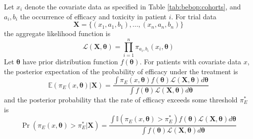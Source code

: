 \documentclass[graybox]{svmult}
\begin{document}
Let $x_i$ denote the covariate data as specified in Table \ref{tab:bebop:cohorts}, and $a_i, b_i$ the occurrence of efficacy and toxicity in patient $i$.
For trial data
\begin{equation}
\boldsymbol{X} = \{(x_1, a_1, b_1), ..., (x_n, a_n, b_n) \}
\end{equation} 
the aggregate likelihood function is
\begin{equation}
\mathcal{L}(\boldsymbol{X}, \boldsymbol{\theta}) = \prod_{i=1}^n \pi_{a_i, b_i} (x_i, \boldsymbol{\theta})
\end{equation}
Let $\boldsymbol{\theta}$ have prior distribution function $f(\boldsymbol{\theta})$.
For patients with covariate data $x$, the posterior expectation of the probability of efficacy under the treatment is 
\begin{equation}
\label{eqn:bebop:post.eff}
\mathbb{E}(\pi_E(x, \boldsymbol{\theta}) | \boldsymbol{X}) = \frac{\int \pi_E(x, \boldsymbol{\theta}) f(\boldsymbol{\theta})  \mathcal{L}(\boldsymbol{X}, \boldsymbol{\theta}) d\boldsymbol{\theta}}{\int f(\boldsymbol{\theta})  \mathcal{L}(\boldsymbol{X}, \boldsymbol{\theta}) d\boldsymbol{\theta}}
\end{equation}
and the posterior probability that the rate of efficacy exceeds some threshold $\pi_E^*$ is 
\begin{equation}
\label{eqn:bebop:post.acc.eff}
\Pr(\pi_E(x, \boldsymbol{\theta}) > \pi_E^*| \boldsymbol{X}) = \frac{\int \mathbb{I}(\pi_E(x, \boldsymbol{\theta}) > \pi_E^*) f(\boldsymbol{\theta})  \mathcal{L}(\boldsymbol{X}, \boldsymbol{\theta}) d\boldsymbol{\theta}}{\int f(\boldsymbol{\theta})  \mathcal{L}(\boldsymbol{X}, \boldsymbol{\theta}) d\boldsymbol{\theta}}
\end{equation}
\end{document}
